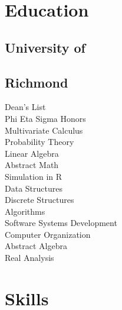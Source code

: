 \documentclass{resume}
\begin{document}

%
%

\begin{minipage}[t]{0.33\textwidth}


\section{Education}

\subsection{University of}
\subsection{Richmond}
Dean's List\\
Phi Eta Sigma Honors \\
{}
Multivariate Calculus\\
Probability Theory \\
Linear Algebra \\
Abstract Math\\
Simulation in R\\
Data Structures\\
Discrete Structures\\
Algorithms\\
Software Systems Development\\
Computer Organization\\
Abstract Algebra\\
Real Analysis\\
\sectionsep



\section{Skills}


\end{minipage}
\end{document}
